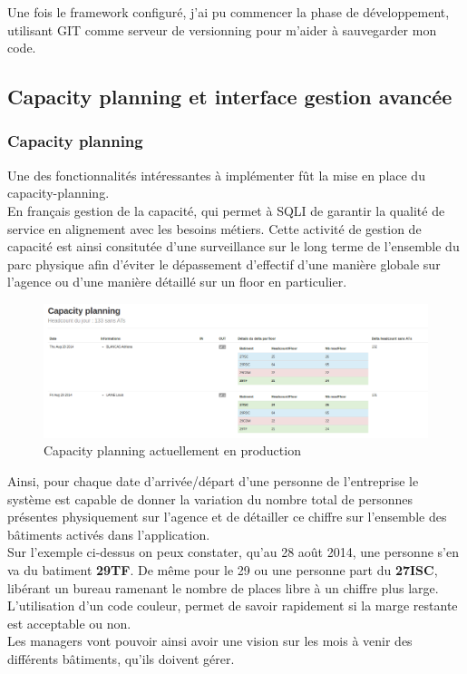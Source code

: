 \documentclass{report}
\newcommand{\jumpOne}{\\[1\baselineskip]}
\newcommand{\jumpTwo}{\\[2\baselineskip]}
\begin{document}
Une fois le \gls{framework} configuré, j'ai pu commencer la phase de développement, utilisant GIT comme serveur de \gls{versionning} pour m'aider à sauvegarder mon code. 

\subsection{Capacity planning et interface gestion avancée}
\subsubsection{Capacity planning}
Une des fonctionnalités intéressantes à implémenter fût la mise en place du \gls{capacity-planning}. 
\jumpOne
En français gestion de la capacité, qui permet à SQLI de garantir la qualité de service en alignement avec les besoins métiers. Cette activité de gestion de capacité est ainsi consitutée d'une surveillance sur le long terme de l'ensemble du parc physique afin d'éviter le dépassement d'effectif d'une manière globale sur l'agence ou d'une manière détaillé sur un floor en particulier.
\begin{figure}[h!]
	\centering
	\includegraphics[width=1.1\textwidth]{assets/screenshot/capa_planning.png}
	\caption{Capacity planning actuellement en production}
\end{figure}

Ainsi, pour chaque date d'arrivée/départ d'une personne de l'entreprise le système est capable de donner la variation du nombre total de personnes présentes physiquement sur l'agence et de détailler ce chiffre sur l'ensemble des bâtiments activés dans l'application. \\
Sur l'exemple ci-dessus on peux constater, qu'au 28 août 2014, une personne s'en va du batiment \textbf{29TF}. De même pour le 29 ou une personne part du \textbf{27ISC}, libérant un bureau ramenant le nombre de places libre à un chiffre plus large. \\
L'utilisation d'un code couleur, permet de savoir rapidement si la marge restante est acceptable ou non.
\jumpTwo
Les managers vont pouvoir ainsi avoir une vision sur les mois à venir des différents bâtiments, qu'ils doivent gérer.
\end{document}
